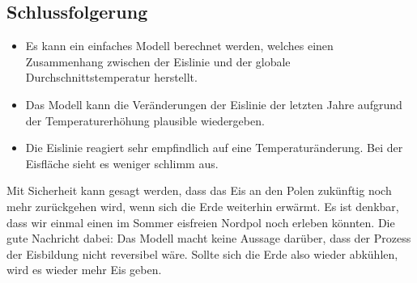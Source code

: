 \begin{refsection}
\section{Schlussfolgerung}
\begin{itemize}
	\item Es kann ein einfaches Modell berechnet werden, welches einen Zusammenhang zwischen der Eislinie und der globale Durchschnittstemperatur herstellt.
	\item Das Modell kann die Veränderungen der Eislinie der letzten Jahre aufgrund der Temperaturerhöhung plausible wiedergeben.
	\item Die Eislinie reagiert sehr empfindlich auf eine Temperaturänderung. Bei der Eisfläche sieht es weniger schlimm aus. 
\end{itemize}
Mit Sicherheit kann gesagt werden, dass das Eis an den Polen zukünftig noch mehr zurückgehen wird, wenn sich die Erde weiterhin erwärmt. Es ist denkbar, dass wir einmal einen im Sommer eisfreien Nordpol noch erleben könnten. Die gute Nachricht dabei: Das Modell macht keine Aussage darüber, dass der Prozess der Eisbildung nicht reversibel wäre. Sollte sich die Erde also wieder abkühlen, wird es wieder mehr Eis geben.
\printbibliography[heading=subbibliography]
\end{refsection}
